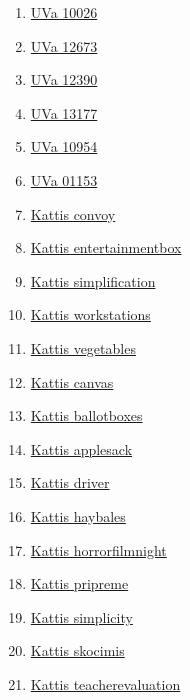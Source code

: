 \begin{enumerate}
\item \href{https://onlinejudge.org/index.php?option=com_onlinejudge&Itemid=8&page=show_problem&problem=967}{UVa 10026}
\item \href{https://onlinejudge.org/index.php?option=com_onlinejudge&Itemid=8&page=show_problem&problem=4411}{UVa 12673}
\item \href{https://onlinejudge.org/index.php?option=com_onlinejudge&Itemid=8&page=show_problem&problem=3812}{UVa 12390}
\item \href{https://onlinejudge.org/index.php?option=com_onlinejudge&Itemid=8&page=show_problem&problem=5088}{UVa 13177}
\item \href{https://onlinejudge.org/index.php?option=com_onlinejudge&Itemid=8&page=show_problem&problem=1895}{UVa 10954}
\item \href{https://onlinejudge.org/index.php?option=com_onlinejudge&Itemid=8&page=show_problem&problem=3594}{UVa 01153}
\item \href{https://open.kattis.com/problems/convoy}{Kattis convoy}
\item \href{https://open.kattis.com/problems/entertainmentbox}{Kattis entertainmentbox}
\item \href{https://open.kattis.com/problems/simplification}{Kattis simplification}
\item \href{https://open.kattis.com/problems/workstations}{Kattis workstations}
\item \href{https://open.kattis.com/problems/vegetables}{Kattis vegetables}
\item \href{https://open.kattis.com/problems/canvas}{Kattis canvas}
\item \href{https://open.kattis.com/problems/ballotboxes}{Kattis ballotboxes}
\item \href{https://open.kattis.com/problems/applesack}{Kattis applesack}
\item \href{https://open.kattis.com/problems/driver}{Kattis driver}
\item \href{https://open.kattis.com/problems/haybales}{Kattis haybales}
\item \href{https://open.kattis.com/problems/horrorfilmnight}{Kattis horrorfilmnight}
\item \href{https://open.kattis.com/problems/pripreme}{Kattis pripreme}
\item \href{https://open.kattis.com/problems/simplicity}{Kattis simplicity}
\item \href{https://open.kattis.com/problems/skocimis}{Kattis skocimis}
\item \href{https://open.kattis.com/problems/teacherevaluation}{Kattis teacherevaluation}

\end{enumerate}
